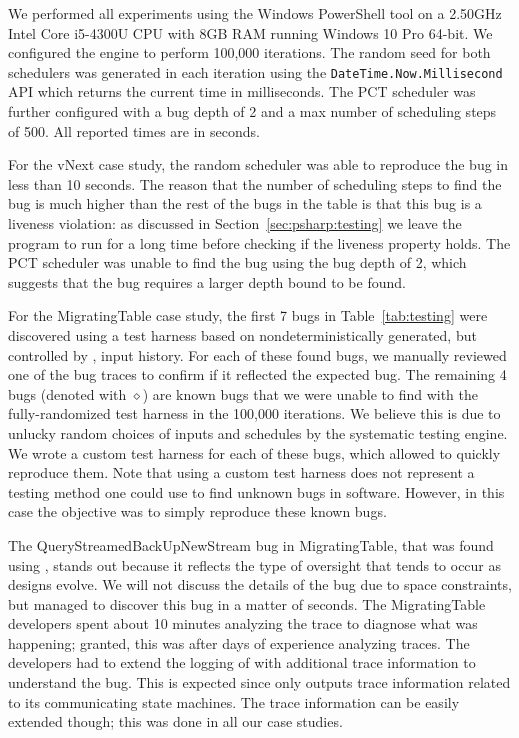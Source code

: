 We performed all experiments using the Windows PowerShell tool on a 2.50GHz Intel Core i5-4300U CPU with 8GB RAM running Windows 10 Pro 64-bit. We configured the engine to perform 100,000 iterations. The random seed for both schedulers was generated in each iteration using the \texttt{DateTime.Now.Millisecond} API which returns the current time in milliseconds. The PCT scheduler was further configured with a bug depth of 2 and a max number of scheduling steps of 500. All reported times are in seconds.

For the vNext case study, the random scheduler was able to reproduce the bug in less than 10 seconds. The reason that the number of scheduling steps to find the bug is much higher than the rest of the bugs in the table is that this bug is a liveness violation: as discussed in Section~\ref{sec:psharp:testing} we leave the program to run for a long time before checking if the liveness property holds. The PCT scheduler was unable to find the bug using the bug depth of 2, which suggests that the bug requires a larger depth bound to be found.

For the MigratingTable case study, the first 7 bugs in Table~\ref{tab:testing} were discovered using a \psharp test harness based on nondeterministically generated, but controlled by \psharp, input history. For each of these found bugs, we manually reviewed one of the bug traces to confirm if it reflected the expected bug. The remaining 4 bugs (denoted with $\diamond$) are known bugs that we were unable to find with the fully-randomized test harness in the 100,000 iterations. We believe this is due to unlucky random choices of inputs and schedules by the \psharp systematic testing engine. We wrote a custom \psharp test harness for each of these bugs, which allowed \psharp to quickly reproduce them. Note that using a custom test harness does not represent a testing method one could use to find unknown bugs in software. However, in this case the objective was to simply reproduce these known bugs.

The QueryStreamedBackUpNewStream bug in MigratingTable, that was found using \psharp, stands out because it reflects the type of oversight that tends to occur as designs evolve. We will not discuss the details of the bug due to space constraints, but \psharp managed to discover this bug in a matter of seconds. The MigratingTable developers spent about 10 minutes analyzing the trace to diagnose what was happening; granted, this was after days of experience analyzing traces. The developers had to extend the logging of \psharp with additional trace information to understand the bug. This is expected since \psharp only outputs trace information related to its communicating state machines. The trace information can be easily extended though; this was done in all our case studies.

